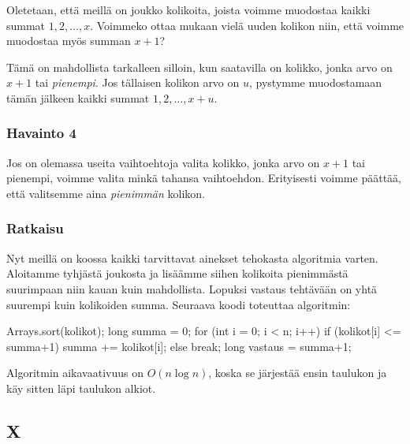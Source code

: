 Oletetaan, että meillä on joukko kolikoita,
joista voimme muodostaa kaikki summat $1,2,\dots,x$.
Voimmeko ottaa mukaan vielä uuden kolikon niin,
että voimme muodostaa myös summan $x+1$?

Tämä on mahdollista tarkalleen silloin, kun saatavilla on kolikko,
jonka arvo on $x+1$ tai \emph{pienempi}.
Jos tällaisen kolikon arvo on $u$, pystymme muodostamaan tämän jälkeen
kaikki summat $1,2,\dots,x+u$.

\subsubsection{Havainto 4}

Jos on olemassa useita vaihtoehtoja valita kolikko,
jonka arvo on $x+1$ tai pienempi,
voimme valita minkä tahansa vaihtoehdon.
Erityisesti voimme päättää, että valitsemme aina
\emph{pienimmän} kolikon.

\subsubsection{Ratkaisu}

Nyt meillä on koossa kaikki tarvittavat ainekset
tehokasta algoritmia varten.
Aloitamme tyhjästä joukosta ja lisäämme siihen kolikoita
pienimmästä suurimpaan niin kauan kuin mahdollista.
Lopuksi vastaus tehtävään on yhtä suurempi kuin kolikoiden
summa.
Seuraava koodi toteuttaa algoritmin:

\begin{code}
Arrays.sort(kolikot);
long summa = 0;
for (int i = 0; i < n; i++) {
    if (kolikot[i] <= summa+1) {
        summa += kolikot[i];
    } else {
        break;
    }
}
long vastaus = summa+1;
\end{code}

Algoritmin aikavaativuus on $O(n \log n)$, koska se
järjestää ensin taulukon ja käy sitten läpi taulukon alkiot.

\subsection{X}

